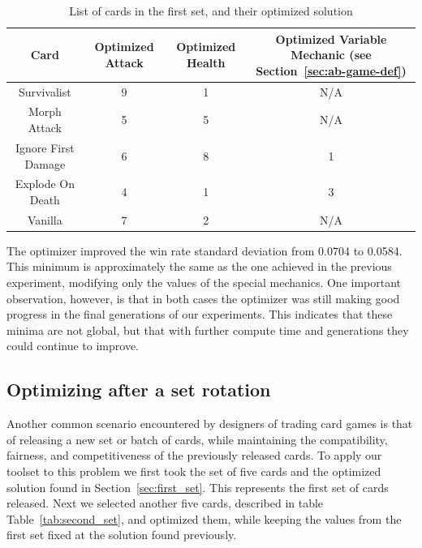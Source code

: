 \begin{table}[t]
\centering
\begin{tabular}{||c c c c||} 
 \hline
 Card & Optimized Attack & Optimized Health & Optimized Variable Mechanic (see Section~\ref{sec:ab-game-def})\\ [0.5ex]
 \hline
 Survivalist & 9 & 1 & N/A \\
 \hline
 Morph Attack & 5 & 5 & N/A \\
 \hline
 Ignore First Damage & 6 & 8 & 1 \\
 \hline
 Explode On Death & 4 & 1 & 3 \\ 
 \hline
 Vanilla & 7 & 2 & N/A \\
 \hline
\end{tabular}
\caption{List of cards in the first set, and their optimized solution}
\label{tab:first_set}
\end{table}

The optimizer improved the win rate standard deviation from 0.0704 to 0.0584. This minimum is approximately the same as the one achieved in the previous experiment, modifying only the values of the special mechanics. One important observation, however, is that in both cases the optimizer was still making good progress in the final generations of our experiments. This indicates that these minima are not global, but that with further compute time and generations they could continue to improve.

\subsection{Optimizing after a set rotation}

Another common scenario encountered by designers of trading card games is that of releasing a new set or batch of cards, while maintaining the compatibility, fairness, and competitiveness of the previously released cards. To apply our toolset to this problem we first took the set of five cards and the optimized solution found in Section~\ref{sec:first_set}. This represents the first set of cards released. Next we selected another five cards, described in table Table~\ref{tab:second_set}, and optimized them, while keeping the values from the first set fixed at the solution found previously. 


